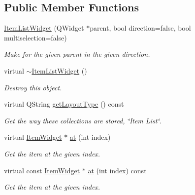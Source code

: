 \subsection*{Public Member Functions}
\begin{DoxyCompactItemize}
\item 
\hyperlink{class_u_i_1_1_item_list_widget_ae9a917aa22830e64114f8bf366a1a930}{Item\-List\-Widget} (Q\-Widget $\ast$parent, bool direction=false, bool multiselection=false)
\begin{DoxyCompactList}\small\item\em Make for the given parent in the given direction. \end{DoxyCompactList}\item 
\hypertarget{class_u_i_1_1_item_list_widget_ad92adc09ff4043b80151b15b8020202d}{virtual \hyperlink{class_u_i_1_1_item_list_widget_ad92adc09ff4043b80151b15b8020202d}{$\sim$\-Item\-List\-Widget} ()}\label{class_u_i_1_1_item_list_widget_ad92adc09ff4043b80151b15b8020202d}

\begin{DoxyCompactList}\small\item\em Destroy this object. \end{DoxyCompactList}\item 
virtual Q\-String \hyperlink{class_u_i_1_1_item_list_widget_a8779995ae54f1b692017d2b78cf29472}{get\-Layout\-Type} () const 
\begin{DoxyCompactList}\small\item\em Get the way these collections are stored, \char`\"{}\-Item List\char`\"{}. \end{DoxyCompactList}\item 
virtual \hyperlink{class_u_i_1_1_item_widget}{Item\-Widget} $\ast$ \hyperlink{class_u_i_1_1_item_list_widget_ac6fb3c75562d678869e26a2af6543ba1}{at} (int index)
\begin{DoxyCompactList}\small\item\em Get the item at the given index. \end{DoxyCompactList}\item 
virtual const \hyperlink{class_u_i_1_1_item_widget}{Item\-Widget} $\ast$ \hyperlink{class_u_i_1_1_item_list_widget_a27a72f371981f9af2194b7c38fa3a83f}{at} (int index) const 
\begin{DoxyCompactList}\small\item\em Get the item at the given index. \end{DoxyCompactList}\end{DoxyCompactItemize}
